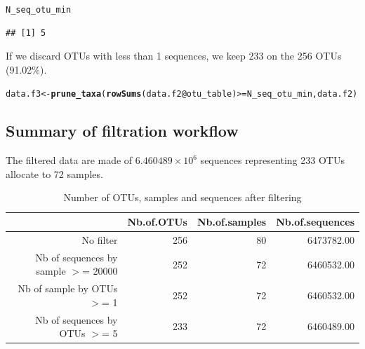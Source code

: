 \documentclass[12pt]{article}\usepackage[]{graphicx}\usepackage[]{color}
\makeatletter
\newcommand{\hlopt}[1]{\textcolor[rgb]{0,0,0}{#1}}%
\newcommand{\hlstd}[1]{\textcolor[rgb]{0.345,0.345,0.345}{#1}}%
\newcommand{\hlkwb}[1]{\textcolor[rgb]{0.69,0.353,0.396}{#1}}%
\newcommand{\hlkwc}[1]{\textcolor[rgb]{0.333,0.667,0.333}{#1}}%
\newcommand{\hlkwd}[1]{\textcolor[rgb]{0.737,0.353,0.396}{\textbf{#1}}}%
\newenvironment{kframe}{%
 \def\at@end@of@kframe{}%
 \ifinner\ifhmode%
  \def\at@end@of@kframe{\end{minipage}}%
  \begin{minipage}{\columnwidth}%
 \fi\fi%
 \def\FrameCommand##1{\hskip\@totalleftmargin \hskip-\fboxsep
 \colorbox{shadecolor}{##1}\hskip-\fboxsep
     \hskip-\linewidth \hskip-\@totalleftmargin \hskip\columnwidth}%
 \MakeFramed {\advance\hsize-\width
   \@totalleftmargin\z@ \linewidth\hsize
   \@setminipage}}%
 {\par\unskip\endMakeFramed%
 \at@end@of@kframe}
\newenvironment{knitrout}{}{} %
\numberwithin{figure}{section}
\makeatother
\begin{document}
\begin{knitrout}\small
{}\color{fgcolor}\begin{kframe}
\begin{alltt}
\hlstd{N_seq_otu_min}
\end{alltt}
\begin{verbatim}
## [1] 5
\end{verbatim}
\end{kframe}
\end{knitrout}

If we discard OTUs with less than 1 sequences, we keep 233 on the 256 OTUs (91.02\%).

\begin{knitrout}\small
{}\color{fgcolor}\begin{kframe}
\begin{alltt}
\hlstd{data.f3} \hlkwb{<-} \hlkwd{prune_taxa}\hlstd{(}\hlkwd{rowSums}\hlstd{(data.f2}\hlopt{@}\hlkwc{otu_table}\hlstd{)} \hlopt{>=} \hlstd{N_seq_otu_min, data.f2)}
\end{alltt}
\end{kframe}
\end{knitrout}

\subsection{Summary of filtration workflow}

The filtered data are made of \ensuremath{6.460489\times 10^{6}} sequences representing 233 OTUs allocate to 72 samples.




\begin{table}[ht]
\centering
\begin{tabular}{rrrr}
  \hline
 & Nb.of.OTUs & Nb.of.samples & Nb.of.sequences \\ 
  \hline
No filter & 256 &  80 & 6473782.00 \\ 
  Nb of sequences by sample $>$=  20000 & 252 &  72 & 6460532.00 \\ 
  Nb of sample by OTUs $>$=  1 & 252 &  72 & 6460532.00 \\ 
  Nb of sequences by OTUs $>$=  5 & 233 &  72 & 6460489.00 \\ 
   \hline
\end{tabular}
\caption{Number of OTUs, samples and sequences after filtering} 
\end{table}
\end{document}
